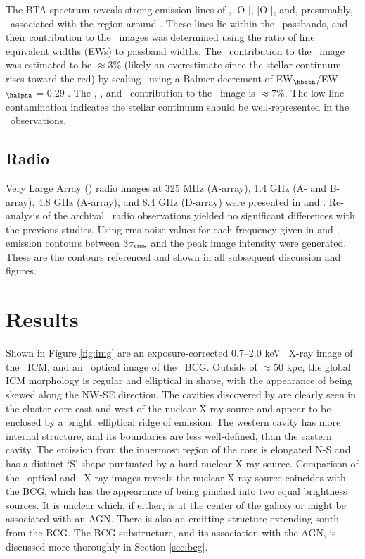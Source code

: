 \documentclass[iop]{emulateapj}
\begin{document}
The BTA spectrum reveals strong emission lines of \hbeta, [O
  ], [O ], and, presumably, \halpha\ associated with
the region around \rbs. These lines lie within the \hst\ passbands,
and their contribution to the \hst\ images was determined using the
ratio of line equivalent widths (EWs) to passband widths. The
\halpha\ contribution to the \myi\ image was estimated to be $\approx
3\%$ (likely an overestimate since the stellar continuum rises toward
the red) by scaling \hbeta\ using a Balmer decrement of
EW$_{\hbeta}$/EW$_{\halpha}$ = 0.29 \citep{2006ApJ...642..775M}. The
\hbeta, \oii, and \oiii\ contribution to the \myv\ image is $\approx
7\%$. The low line contamination indicates the stellar continuum
should be well-represented in the \hst\ observations.

\subsection{Radio}

Very Large Array (\vla) radio images at 325 MHz (A-array), 1.4 GHz (A-
and B-array), 4.8 GHz (A-array), and 8.4 GHz (D-array) were presented
in \citet{gitti06} and \citet{birzan08}. Re-analysis of the archival
\vla\ radio observations yielded no significant differences with the
previous studies. Using rms noise values for each frequency given in
\citet{gitti06} and \citet{birzan08}, emission contours between
$3\sigma_{\rm{rms}}$ and the peak image intensity were
generated. These are the contours referenced and shown in all
subsequent discussion and figures.

\section{Results}
\label{sec:results}

Shown in Figure \ref{fig:img} are an exposure-corrected 0.7--2.0 keV
\cxo\ X-ray image of the \rbs\ ICM, and an \hst\ optical image of the
\rbs\ BCG. Outside of $\approx 50$ kpc, the global ICM morphology is
regular and elliptical in shape, with the appearance of being skewed
along the NW-SE direction. The cavities discovered by
\citet{schindler01} are clearly seen in the cluster core east and west
of the nuclear X-ray source and appear to be enclosed by a bright,
elliptical ridge of emission. The western cavity has more internal
structure, and its boundaries are less well-defined, than the eastern
cavity. The emission from the innermost region of the core is
elongated N-S and has a distinct `S'-shape puntuated by a hard nuclear
X-ray source. Comparison of the \hst\ optical and \cxo\ X-ray images
reveals the nuclear X-ray source coincides with the BCG, which has the
appearance of being pinched into two equal brightness sources. It is
unclear which, if either, is at the center of the galaxy or might be
associated with an AGN. There is also an emitting structure extending
south from the BCG. The BCG substructure, and its association with the
AGN, is discussed more thoroughly in Section \ref{sec:bcg}.
\end{document}
